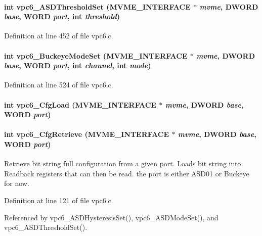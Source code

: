 \paragraph[{vpc6\_\-ASDThresholdSet}]{\setlength{\rightskip}{0pt plus 5cm}int vpc6\_\-ASDThresholdSet ({\bf MVME\_\-INTERFACE} $\ast$ {\em mvme}, \/  {\bf DWORD} {\em base}, \/  {\bf WORD} {\em port}, \/  int {\em threshold})}\hfill\label{vpc6_8h_a9db368fa1397111277bd83a7de1ac548}


Definition at line 452 of file vpc6.c.
\paragraph[{vpc6\_\-BuckeyeModeSet}]{\setlength{\rightskip}{0pt plus 5cm}int vpc6\_\-BuckeyeModeSet ({\bf MVME\_\-INTERFACE} $\ast$ {\em mvme}, \/  {\bf DWORD} {\em base}, \/  {\bf WORD} {\em port}, \/  int {\em channel}, \/  int {\em mode})}\hfill\label{vpc6_8h_ab1018e72d9d1f8c2401ba5859875a290}


Definition at line 524 of file vpc6.c.
\paragraph[{vpc6\_\-CfgLoad}]{\setlength{\rightskip}{0pt plus 5cm}int vpc6\_\-CfgLoad ({\bf MVME\_\-INTERFACE} $\ast$ {\em mvme}, \/  {\bf DWORD} {\em base}, \/  {\bf WORD} {\em port})}\hfill\label{vpc6_8h_ac89a7eb9823f6374d641e04385bc037c}
\paragraph[{vpc6\_\-CfgRetrieve}]{\setlength{\rightskip}{0pt plus 5cm}int vpc6\_\-CfgRetrieve ({\bf MVME\_\-INTERFACE} $\ast$ {\em mvme}, \/  {\bf DWORD} {\em base}, \/  {\bf WORD} {\em port})}\hfill\label{vpc6_8h_a7def69c129b90426d2c5834b18d1b81f}
Retrieve bit string full configuration from a given port. Loads bit string into Readback registers that can then be read. the port is either ASD01 or Buckeye for now. 

Definition at line 121 of file vpc6.c.

Referenced by vpc6\_\-ASDHysteresisSet(), vpc6\_\-ASDModeSet(), and vpc6\_\-ASDThresholdSet().
